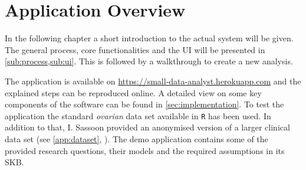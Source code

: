 \section{Application Overview}
\label{sec:app}
In the following chapter a short introduction to the actual system will be given. The general process, core functionalities and the \gls{UI} will be presented in \cref{sub:process,sub:ui}. This is followed by a walkthrough to create a new analysis. 

The application is available on \href{https://small-data-analyst.herokuapp.com}{https://small-data-analyst.herokuapp.com} and the explained steps can be reproduced online. A detailed view on some key components of the software can be found in \autoref{sec:implementation}. To test the application the standard \textit{ovarian} data set available in \texttt{R} has been used. In addition to that, I. Sassoon provided an anonymised version of a larger clinical data set (see \autoref{app:dataset}, ). The demo application contains some of the provided research questions, their models and the required assumptions in its \gls{SKB}.









